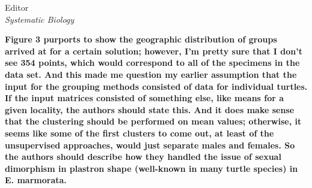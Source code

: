 \documentclass{letter}
\begin{document}
\begin{letter}{Editor \\ \textit{Systematic Biology}}

  \textbf{Figure 3 purports to show the geographic distribution of groups arrived at for a certain solution; however, I’m pretty sure that I don’t see 354 points, which would correspond to all of the specimens in the data set. And this made me question my earlier assumption that the input for the grouping methods consisted of data for individual turtles. If the input matrices consisted of something else, like means for a given locality, the authors should state this. And it does make sense that the clustering should be performed on mean values; otherwise, it seems like some of the first clusters to come out, at least of the unsupervised approaches, would just separate males and females. So the authors should describe how they handled the issue of sexual dimorphism in plastron shape (well-known in many turtle species) in E. marmorata. }



\end{letter}
\end{document}
